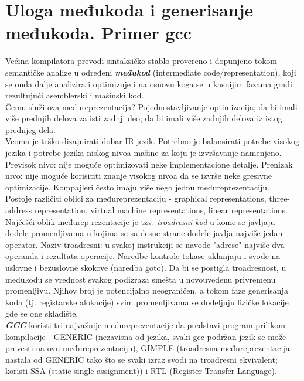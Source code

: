 \documentclass[10pt]{extarticle}
\begin{document}
\section{Uloga međukoda i generisanje međukoda. Primer gcc}
\noindent
Većina kompilatora prevodi sintaksičko stablo provereno i dopunjeno tokom semantičke analize u određeni \textit{\textbf{međukod}} (intermediate code/representation), koji se onda dalje analizira i optimizuje i na osnovu koga se u kasnijim fazama gradi rezultujući asemblerski i mašinski kod. \\
Čemu služi ova međureprezentacija? Pojednostavljivanje optimizacija; da bi imali više prednjih delova za isti zadnji deo; da bi imali više zadnjih delova iz istog prednjeg dela. \\
Veoma je teško dizajnirati dobar IR jezik. Potrebno je balansirati potrebe visokog jezika i potrebe jezika niskog nivoa mašine za koju je izvršavanje namenjeno. Previsok nivo: nije moguće optimizovati neke
implementacione detalje. Prenizak nivo: nije moguće korisititi znanje visokog nivoa da se izvrše neke gresivne optimizacije. Kompajleri često imaju više nego jednu međureprezentaciju. \\
Postoje različiti oblici za međureprezentaciju - graphical representations, three-address representation, virtual machine representations, linear representations. Najčešći oblik međurep-rezentacije je tzv. \textit{troadresni kod} u kome se javljaju dodele promenljivama u kojima se sa desne strane dodele
javlja najviše jedan operator. Naziv troadresni: u svakoj instrukciji se navode "adrese" najviše dva operanda i rezultata operacije. Naredbe kontrole tokase uklanjaju i svode na uslovne i bezuslovne skokove (naredba goto). Da bi se postigla troadresnost, u međukodu se vrednost svakog podizraza smešta u novouvedenu privremenu promenljivu. Njihov broj je potencijalno neograničen, a tokom faze generisanja koda (tj. registarske alokacije) svim promenljivama se dodeljuju fizičke lokacije gde se one skladište. \\
\textit{\textbf{GCC}} koristi tri najvažnije međureprezentacije da predstavi program prilikom kompilacije - GENERIC (nezavisna od jezika, svaki gcc podržan jezik se može prevesti na ovu međureprezentaciju), GIMPLE (troadresna međureprezentacija nastala od GENERIC tako što se svaki izraz svodi na troadresni ekvivalent; koristi SSA (static single assignment)) i RTL (Register Transfer Language).
\end{document}
